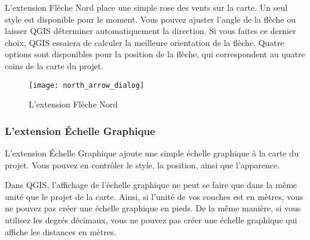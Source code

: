L'extension Flèche Nord place une simple rose des vents sur la carte. Un seul
style est disponible pour le moment. Vous pouvez ajuster l'angle de la flèche 
ou laisser QGIS déterminer automatiquement la direction. Si vous faites ce 
dernier choix, QGIS essaiera de calculer la meilleure orientation de la flèche.
Quatre options sont disponibles pour la position de la flèche, qui correspondent
au quatre coins de la carte du projet.

\begin{figure}[ht]
   \begin{center}
   \caption{L'extension Flèche Nord \nixcaption}\label{fig:north_arrow}\smallskip
   \texttt{[image: north\_arrow\_dialog]}
\end{center}  
\end{figure}

\subsubsection{L'extension Échelle Graphique}

L'extension Échelle Graphique ajoute une simple échelle graphique à la carte du
projet.
Vous pouvez en contrôler le style, la position, ainsi que l'apparence.

Dans QGIS, l'affichage de l'échelle graphique ne peut se faire que dans la même 
unité que le projet de la carte. Ainsi, si l'unité de vos couches est en mètres, 
vous ne pouvez pas créer une échelle graphique en pieds. De la même manière, si 
vous utilisez les degrés décimaux, vous ne pouvez pas créer une échelle 
graphique qui affiche les distances en mètres.

